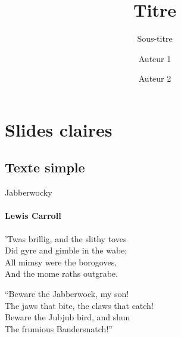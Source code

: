 \documentclass{beamer}
\title{Titre}
\subtitle{Sous-titre}
\author{Auteur 1 \and Auteur 2}
\begin{document}
\begin{frame}[plain]
\maketitle{}
\end{frame}




\section{Slides claires}
\subsection{Texte simple}
\begin{frame}{Jabberwocky}
\framesubtitle{Lewis Carroll}%
'Twas brillig, and the slithy toves\\
Did gyre and gimble in the wabe;\\
All mimsy were the borogoves,\\
And the mome raths outgrabe.\\\bigskip

“Beware the Jabberwock, my son!\\
The jaws that bite, the claws that catch!\\
Beware the Jubjub bird, and shun\\
The frumious Bandersnatch!”\\
\end{frame}
\end{document}
